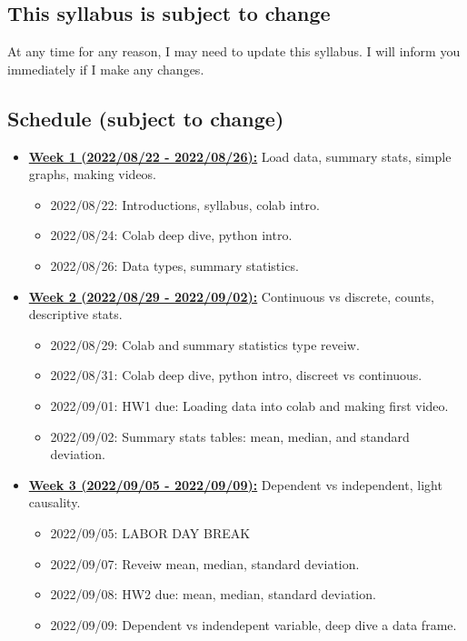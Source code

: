 \documentclass[11pt]{article}
\begin{document}
\subsection*{This syllabus is subject to change}
At any time for any reason, I may need to update this syllabus.  I will inform you immediately if
I make any changes.


\subsection*{Schedule (subject to change)}

\begin{itemize}
  \item \underline{\textbf{Week 1 (2022/08/22 - 2022/08/26):}} Load data, summary stats, simple graphs, making videos.
  \begin{itemize}
    \item 2022/08/22: Introductions, syllabus, colab intro.
    \item 2022/08/24: Colab deep dive, python intro.
    \item 2022/08/26: Data types, summary statistics.
  \end{itemize}
  
  \item \underline{\textbf{Week 2 (2022/08/29 - 2022/09/02):}} Continuous vs discrete, counts, descriptive stats.
  \begin{itemize}
    \item 2022/08/29: Colab and summary statistics type reveiw. 
    \item 2022/08/31: Colab deep dive, python intro, discreet vs continuous.
    \item 2022/09/01: HW1 due: Loading data into colab and making first video.
    \item 2022/09/02: Summary stats tables: mean, median, and standard deviation. 
  \end{itemize}

  \item \underline{\textbf{Week 3 (2022/09/05 - 2022/09/09):}} Dependent vs independent, light causality. 
  \begin{itemize}
    \item 2022/09/05: LABOR DAY BREAK
    \item 2022/09/07: Reveiw mean, median, standard deviation. 
    \item 2022/09/08: HW2 due: mean, median, standard deviation.
    \item 2022/09/09: Dependent vs indendepent variable, deep dive a data frame. 
  \end{itemize}



\end{itemize}
\end{document}
